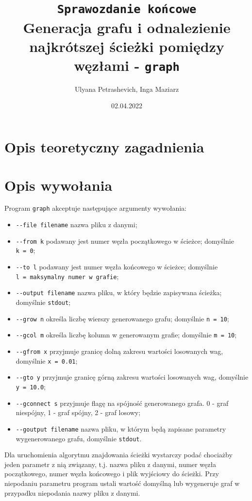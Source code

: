 \documentclass[]{article}
\title{\texttt{Sprawozdanie końcowe}\\Generacja grafu i odnalezienie najkrótszej ścieżki pomiędzy węzłami - \texttt{graph}}
\author{Ulyana Petrashevich, Inga Maziarz}
\date{02.04.2022}
\begin{document}
\maketitle

\section{Opis teoretyczny zagadnienia}\label{header-n231}


\section{Opis wywołania}\label{header-n233}
Program \texttt{graph} akceptuje następujące argumenty wywołania:

\begin{itemize}
\item
  \texttt{-{}-file\ filename} nazwa pliku z danymi;
\item
  \texttt{-{}-from\ k} podawany jest numer węzła początkowego w ścieżce; domyślnie \texttt{k\ =\ 0};
\item
  \texttt{-{}-to\ l} podawany jest numer węzła końcowego w ścieżce; domyślnie \texttt{l\ =\ maksymalny numer w grafie};
\item
  \texttt{-{}-output\ filename} nazwa pliku, w który będzie zapisywana ścieżka; domyślnie \texttt{stdout};
\item
  \texttt{-{}-grow\ n} określa liczbę wierszy generowanego grafu; domyślnie \texttt{n\ =\ 10};
\item
  \texttt{-{}-gcol\ m} określa liczbę kolumn w generowanym grafie; domyślnie \texttt{m\ =\ 10};
\item
  \texttt{-{}-gfrom\ x} przyjmuje granicę dolną zakresu wartości losowanych wag, domyślnie \texttt{x\ =\ 0.01};
\item
  \texttt{-{}-gto\ y} przyjmuje granicę górną zakresu wartości losowanych wag, domyślnie \texttt{y\ =\ 10.0};
\item
  \texttt{-{}-gconnect\ s} przyjmuje flagę na spójność generowanego grafa. 0 - graf niespójny, 1 - graf spójny, 2 - graf losowy;
\item
  \texttt{-{}-goutput\ filename} nazwa pliku, w którym będą zapisane parametry wygenerowanego grafu, domyślnie \texttt{stdout}.
\end{itemize}
Dla uruchomienia algorytmu znajdowania ścieżki wystarczy podać chociażby jeden parametr z nią związany, t.j. nazwa pliku z danymi, numer węzła początkowego, numer węzła końcowego i plik wyjściowy do ścieżki. Przy niepodaniu parametru program ustali wartość domyślną lub wygeneruje graf w przypadku niepodania nazwy pliku z danymi.
\end{document}
